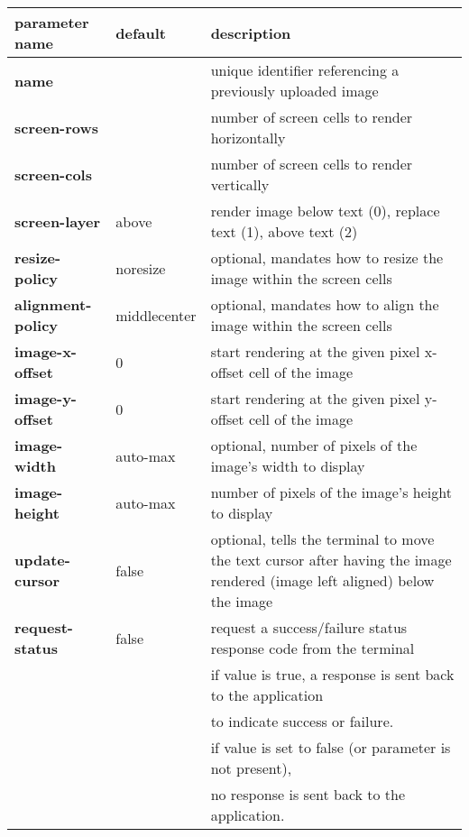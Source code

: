 \documentclass[a4paper]{article}
\begin{document}
\begin{tabular}{|l|l|l|}
    \hline
    \textbf{parameter name}   & \textbf{default} & \textbf{description} \\
    \hline
    \textbf{name}             &                  & unique identifier referencing a previously uploaded image \\
    \textbf{screen-rows}      &                  & number of screen cells to render horizontally \\
    \textbf{screen-cols}      &                  & number of screen cells to render vertically \\
    \textbf{screen-layer}     & above            & render image below text (0), replace text (1), above text (2) \\
    \textbf{resize-policy}    & noresize         & optional, mandates how to resize the image within the screen cells \\
    \textbf{alignment-policy} & middlecenter     & optional, mandates how to align the image within the screen cells \\
    \textbf{image-x-offset}   & 0                & start rendering at the given pixel x-offset cell of the image \\
    \textbf{image-y-offset}   & 0                & start rendering at the given pixel y-offset cell of the image \\
    \textbf{image-width}      & auto-max         & optional, number of pixels of the image's width to display \\
    \textbf{image-height}     & auto-max         & number of pixels of the image's height to display \\
    \textbf{update-cursor}    & false            & optional, tells the terminal to move the text cursor after having the image rendered (image left aligned) below the image \\
    \textbf{request-status}   & false            & request a success/failure status response code from the terminal \\
                              &                  & if value is true, a response is sent back to the application \\
                              &                  & to indicate success or failure. \\
                              &                  & if value is set to false (or parameter is not present), \\
                              &                  & no response is sent back to the application. \\
    \hline
\end{tabular}
\end{document}
